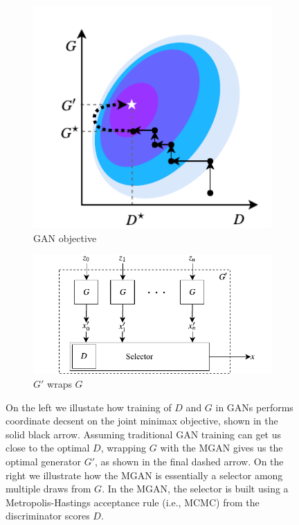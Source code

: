 \documentclass{article}
\begin{document}
\begin{figure}[bhtp]
    \centering
    \begin{subfigure}[t]{2.25in}
       \centering
       \includegraphics[scale=1.0]{figures/coord_descent.pdf}
       \caption{GAN objective}
    \end{subfigure}
    \hfill
    \begin{subfigure}[t]{3in}
       \centering
       \includegraphics[scale=1.0]{figures/block_diag.pdf}
       \caption{$G'$ wraps $G$}
    \end{subfigure}
    \caption{{\small
    On the left we illustate how training of $D$ and $G$ in GANs performs coordinate decsent on the joint minimax objective, shown in the solid black arrow.
    Assuming traditional GAN training can get us close to the optimal $D$, wrapping $G$ with the MGAN gives us the optimal generator $G'$, as shown in the final dashed arrow.
    On the right we illustrate how the MGAN is essentially a selector among multiple draws from $G$.
    In the MGAN, the selector is built using a Metropolis-Hastings acceptance rule (i.e., MCMC) from the discriminator scores $D$.
    }}
    \label{fig:block_diag}
\end{figure}
\end{document}
